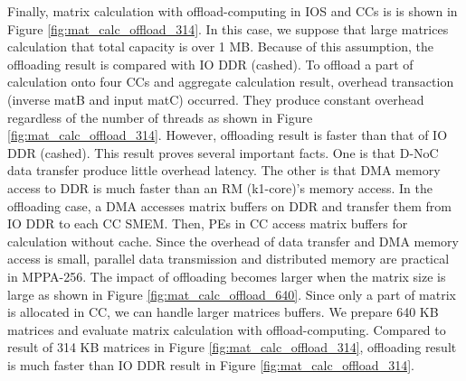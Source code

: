 \documentclass{sig-alternate-05-2015}
\begin{document}
Finally, matrix calculation with offload-computing in IOS and CCs is is shown in Figure \ref{fig:mat_calc_offload_314}.
In this case, we suppose that large matrices calculation that total capacity is over 1 MB.
Because of this assumption, the offloading result is compared with IO DDR (cashed).
To offload a part of calculation onto four CCs and aggregate calculation result, overhead transaction (inverse matB and input matC) occurred.
They produce constant overhead regardless of the number of threads as shown in Figure \ref{fig:mat_calc_offload_314}.
However, offloading result is faster than that of IO DDR (cashed).
This result proves several important facts.
One is that D-NoC data transfer produce little overhead latency.
The other is that DMA memory access to DDR is much faster than an RM (k1-core)'s memory access.
In the offloading case, a DMA accesses matrix buffers on DDR and transfer them from IO DDR to each CC SMEM.
Then, PEs in CC access matrix buffers for calculation without cache.
Since the overhead of data transfer and DMA memory access is small, parallel data transmission and distributed memory are practical in MPPA-256.
The impact of offloading becomes larger when the matrix size is large as shown in Figure \ref{fig:mat_calc_offload_640}.
Since only a part of matrix is allocated in CC, we can handle larger matrices buffers.
We prepare 640 KB matrices and evaluate matrix calculation with offload-computing.
Compared to result of 314 KB matrices in Figure \ref{fig:mat_calc_offload_314}, offloading result is much faster than IO DDR result in Figure \ref{fig:mat_calc_offload_314}.
\end{document}

